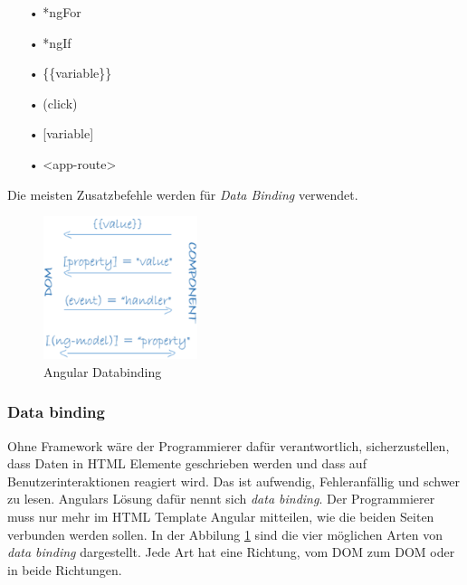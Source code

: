 \begin{itemize}
\item[•]*ngFor
\item[•]*ngIf
\item[•]\{\{variable\}\}
\item[•](click)
\item[•][variable]
\item[•]<app-route>
\end{itemize}

Die meisten Zusatzbefehle werden für \textit{Data Binding} verwendet.

\mbox{}
\begin{figure}
\vspace{-50pt}
  \begin{center}
    \includegraphics[width=0.4\textwidth]{Bilder/Greistorfer/databinding}
  \end{center}
  \caption{Angular Databinding}
  \label{Angular Databinding}
  \vspace{-60pt}
\end{figure}
\vspace{-40pt}
\subsubsection{Data binding}
\label{sec:ang-data-binding}
Ohne Framework wäre der Programmierer dafür verantwortlich, sicherzustellen, dass Daten in \ac{HTML} Elemente geschrieben werden und dass auf Benutzerinteraktionen reagiert wird. Das ist aufwendig, Fehleranfällig und schwer zu lesen. Angulars Lösung dafür nennt sich \textit{data binding}. Der Programmierer muss nur mehr im \ac{HTML} Template Angular mitteilen, wie die beiden Seiten verbunden werden sollen. In der Abbilung \ref{Angular Databinding} sind die vier möglichen Arten von \textit{data binding} dargestellt. Jede Art hat eine Richtung, vom \ac{DOM} zum \ac{DOM} oder in beide Richtungen.

